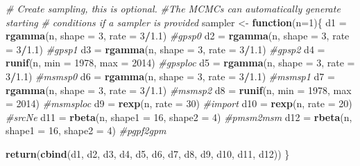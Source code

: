 \documentclass[12pt,]{article}
\newenvironment{Shaded}{\begin{snugshade}}{\end{snugshade}}
\newcommand{\CommentTok}[1]{\textcolor[rgb]{0.56,0.35,0.01}{\textit{#1}}}
\newcommand{\ControlFlowTok}[1]{\textcolor[rgb]{0.13,0.29,0.53}{\textbf{#1}}}
\newcommand{\DataTypeTok}[1]{\textcolor[rgb]{0.13,0.29,0.53}{#1}}
\newcommand{\DecValTok}[1]{\textcolor[rgb]{0.00,0.00,0.81}{#1}}
\newcommand{\FloatTok}[1]{\textcolor[rgb]{0.00,0.00,0.81}{#1}}
\newcommand{\KeywordTok}[1]{\textcolor[rgb]{0.13,0.29,0.53}{\textbf{#1}}}
\newcommand{\NormalTok}[1]{#1}
\newcommand{\OperatorTok}[1]{\textcolor[rgb]{0.81,0.36,0.00}{\textbf{#1}}}
\newcommand{\StringTok}[1]{\textcolor[rgb]{0.31,0.60,0.02}{#1}}
\begin{document}
\begin{Shaded}
\begin{Highlighting}[]
\CommentTok{# Create sampling, this is optional. }
\CommentTok{#The MCMCs can automatically generate starting}
\CommentTok{# conditions if a sampler is provided}
\NormalTok{sampler <-}\StringTok{  }\ControlFlowTok{function}\NormalTok{(}\DataTypeTok{n=}\DecValTok{1}\NormalTok{)\{}
\NormalTok{  d1 =}\StringTok{ }\KeywordTok{rgamma}\NormalTok{(n, }\DataTypeTok{shape =} \DecValTok{3}\NormalTok{, }\DataTypeTok{rate =} \DecValTok{3}\OperatorTok{/}\FloatTok{1.1}\NormalTok{) }\CommentTok{#gpsp0}
\NormalTok{  d2 =}\StringTok{ }\KeywordTok{rgamma}\NormalTok{(n, }\DataTypeTok{shape =} \DecValTok{3}\NormalTok{, }\DataTypeTok{rate =} \DecValTok{3}\OperatorTok{/}\FloatTok{1.1}\NormalTok{) }\CommentTok{#gpsp1}
\NormalTok{  d3 =}\StringTok{ }\KeywordTok{rgamma}\NormalTok{(n, }\DataTypeTok{shape =} \DecValTok{3}\NormalTok{, }\DataTypeTok{rate =} \DecValTok{3}\OperatorTok{/}\FloatTok{1.1}\NormalTok{) }\CommentTok{#gpsp2}
\NormalTok{  d4 =}\StringTok{ }\KeywordTok{runif}\NormalTok{(n, }\DataTypeTok{min =} \DecValTok{1978}\NormalTok{, }\DataTypeTok{max =} \DecValTok{2014}\NormalTok{) }\CommentTok{#gpsploc}
\NormalTok{  d5 =}\StringTok{ }\KeywordTok{rgamma}\NormalTok{(n, }\DataTypeTok{shape =} \DecValTok{3}\NormalTok{, }\DataTypeTok{rate =} \DecValTok{3}\OperatorTok{/}\FloatTok{1.1}\NormalTok{) }\CommentTok{#msmsp0}
\NormalTok{  d6 =}\StringTok{ }\KeywordTok{rgamma}\NormalTok{(n, }\DataTypeTok{shape =} \DecValTok{3}\NormalTok{, }\DataTypeTok{rate =} \DecValTok{3}\OperatorTok{/}\FloatTok{1.1}\NormalTok{) }\CommentTok{#msmsp1}
\NormalTok{  d7 =}\StringTok{ }\KeywordTok{rgamma}\NormalTok{(n, }\DataTypeTok{shape =} \DecValTok{3}\NormalTok{, }\DataTypeTok{rate =} \DecValTok{3}\OperatorTok{/}\FloatTok{1.1}\NormalTok{) }\CommentTok{#msmsp2}
\NormalTok{  d8 =}\StringTok{ }\KeywordTok{runif}\NormalTok{(n, }\DataTypeTok{min =} \DecValTok{1978}\NormalTok{, }\DataTypeTok{max =} \DecValTok{2014}\NormalTok{) }\CommentTok{#msmsploc}
\NormalTok{  d9 =}\StringTok{ }\KeywordTok{rexp}\NormalTok{(n, }\DataTypeTok{rate =} \DecValTok{30}\NormalTok{) }\CommentTok{#import}
\NormalTok{  d10 =}\StringTok{ }\KeywordTok{rexp}\NormalTok{(n, }\DataTypeTok{rate =} \DecValTok{20}\NormalTok{) }\CommentTok{#srcNe}
\NormalTok{  d11 =}\StringTok{ }\KeywordTok{rbeta}\NormalTok{(n, }\DataTypeTok{shape1 =} \DecValTok{16}\NormalTok{, }\DataTypeTok{shape2 =} \DecValTok{4}\NormalTok{) }\CommentTok{#pmsm2msm}
\NormalTok{  d12 =}\StringTok{ }\KeywordTok{rbeta}\NormalTok{(n, }\DataTypeTok{shape1 =} \DecValTok{16}\NormalTok{, }\DataTypeTok{shape2 =} \DecValTok{4}\NormalTok{) }\CommentTok{#pgpf2gpm}

  \KeywordTok{return}\NormalTok{(}\KeywordTok{cbind}\NormalTok{(d1, d2, d3, d4, d5, d6, d7, d8, d9, d10, d11, d12))}
\NormalTok{\}}
\end{Highlighting}
\end{Shaded}
\end{document}
